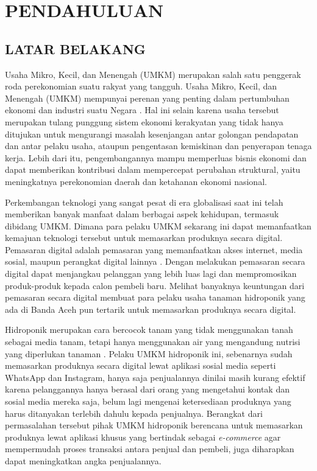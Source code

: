 \fancyhf{} 
\fancyfoot[C]{\thepage}

\chapter{PENDAHULUAN}

\section{\uppercase{LATAR BELAKANG}}
Usaha Mikro, Kecil, dan Menengah (UMKM) merupakan salah satu penggerak roda perekonomian suatu rakyat yang tangguh. Usaha Mikro, Kecil, dan Menengah (UMKM) mempunyai perenan yang penting dalam pertumbuhan ekonomi dan industri suatu Negara \citep{prastika2014pengaruh}. Hal ini selain karena usaha tersebut merupakan tulang punggung sistem ekonomi kerakyatan yang tidak hanya ditujukan untuk mengurangi masalah kesenjangan antar golongan pendapatan dan antar pelaku usaha, ataupun pengentasan kemiskinan dan penyerapan tenaga kerja. Lebih dari itu, pengembangannya mampu memperluas bisnis ekonomi dan dapat memberikan kontribusi dalam mempercepat perubahan struktural, yaitu meningkatnya perekonomian daerah dan ketahanan ekonomi nasional.

\par Perkembangan teknologi yang sangat pesat di era globalisasi saat ini telah memberikan banyak manfaat dalam berbagai aspek kehidupan, termasuk dibidang UMKM. Dimana para pelaku UMKM sekarang ini dapat memanfaatkan kemajuan teknologi tersebut untuk memasarkan produknya secara digital. Pemasaran digital adalah pemasaran yang memanfaatkan akses internet, media sosial, maupun perangkat digital lainnya \citep{hardilawati2020strategi}. Dengan melakukan pemasaran secara digital dapat menjangkau pelanggan yang lebih luas lagi dan mempromosikan produk-produk kepada calon pembeli baru. Melihat banyaknya keuntungan dari pemasaran secara digital membuat para pelaku usaha tanaman hidroponik yang ada di Banda Aceh pun tertarik untuk memasarkan produknya secara digital.

\par Hidroponik merupakan cara bercocok tanam yang tidak menggunakan tanah sebagai media tanam, tetapi hanya menggunakan air yang mengandung nutrisi yang diperlukan tanaman \citep{prayitno2017sistem}. Pelaku UMKM hidroponik ini, sebenarnya sudah memasarkan produknya secara digital lewat aplikasi sosial media seperti WhatsApp dan Instagram, hanya saja penjualannya dinilai masih kurang efektif karena pelanggannya hanya berasal dari orang yang mengetahui kontak dan sosial media mereka saja, belum lagi mengenai ketersediaan produknya yang harus ditanyakan terlebih dahulu kepada penjualnya. Berangkat dari permasalahan tersebut pihak UMKM hidroponik berencana untuk memasarkan produknya lewat aplikasi khusus yang bertindak sebagai \textit{e-commerce} agar mempermudah proses transaksi antara penjual dan pembeli, juga diharapkan dapat meningkatkan angka penjualannya.

